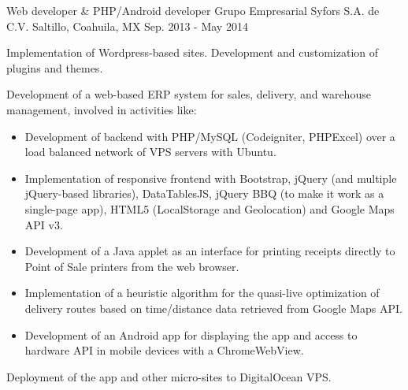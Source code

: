 \begin{cventries}
\cventry
{Web developer \& PHP/Android developer} %
{Grupo Empresarial Syfors S.A. de C.V.} %
{Saltillo, Coahuila, MX} %
{Sep. 2013 - May 2014} %
{ %
	\begin{cvitems}
		\item {Implementation of Wordpress-based sites. Development and customization of plugins and themes.}
		\item {Development of a web-based ERP system for sales, delivery, and warehouse management, involved in activities like:}
		\begin{itemize}
			\item {Development of backend with PHP/MySQL (Codeigniter, PHPExcel) over a load balanced network of VPS servers with Ubuntu.}
			\item {Implementation of responsive frontend with Bootstrap, jQuery (and multiple jQuery-based libraries), DataTablesJS, jQuery BBQ (to make it work as a single-page app), HTML5 (LocalStorage and Geolocation) and Google Maps API v3.}
			\item {Development of a Java applet as an interface for printing receipts directly to Point of Sale printers from the web browser.}
			\item {Implementation of a heuristic algorithm for the quasi-live optimization of delivery routes based on time/distance data retrieved from Google Maps API.}
			\item {Development of an Android app for displaying the app and access to hardware API in mobile devices with a ChromeWebView.}
		\end{itemize}
		\item {Deployment of the app and other micro-sites to DigitalOcean VPS.}
	\end{cvitems} 
}



\end{cventries}
